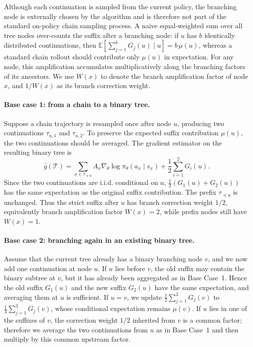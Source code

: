 Although each continuation is sampled from the current policy, the branching node is externally chosen by the algorithm and is therefore not part of the standard on-policy chain sampling process. A naive equal-weighted sum over all tree nodes over-counts the suffix after a branching node: if $u$ has $b$ identically distributed continuations, then $\mathbb{E}[\sum_{j=1}^b G_j(u)\mid u]=b\,\mu(u)$, whereas a standard chain rollout should contribute only $\mu(u)$ in expectation. For any node, this amplification accumulates multiplicatively along the branching factors of its ancestors. We use $W(x)$ to denote the branch amplification factor of node $x$, and $1/W(x)$ as its branch correction weight.

\paragraph{Base case 1: from a chain to a binary tree.}
Suppose a chain trajectory is resampled once after node $u$, producing two continuations $\tau_{u,1}$ and $\tau_{u,2}$. To preserve the expected suffix contribution $\mu(u)$, the two continuations should be averaged. The gradient estimator on the resulting binary tree is
\[
\hat g(\mathcal{T})
=
\sum_{x\in\tau_{\preceq u}}
A_x\nabla_\theta\log\pi_\theta(a_x\mid s_x)
+
\frac{1}{2}\sum_{i=1}^{2}G_i(u).
\]
Since the two continuations are i.i.d. conditional on $u$, $\frac{1}{2}(G_1(u)+G_2(u))$ has the same expectation as the original suffix contribution. The prefix $\tau_{\preceq u}$ is unchanged. Thus the strict suffix after $u$ has branch correction weight $1/2$, equivalently branch amplification factor $W(x)=2$, while prefix nodes still have $W(x)=1$.

\paragraph{Base case 2: branching again in an existing binary tree.}
Assume that the current tree already has a binary branching node $v$, and we now add one continuation at node $u$. If $u$ lies before $v$, the old suffix may contain the binary subtree at $v$, but it has already been aggregated as in Base Case~1. Hence the old suffix $G_1(u)$ and the new suffix $G_2(u)$ have the same expectation, and averaging them at $u$ is sufficient. If $u=v$, we update $\frac{1}{2}\sum_{j=1}^2G_j(v)$ to $\frac{1}{3}\sum_{j=1}^3G_j(v)$, whose conditional expectation remains $\mu(v)$. If $u$ lies in one of the suffixes of $v$, the correction weight $1/2$ inherited from $v$ is a common factor; therefore we average the two continuations from $u$ as in Base Case~1 and then multiply by this common upstream factor.

